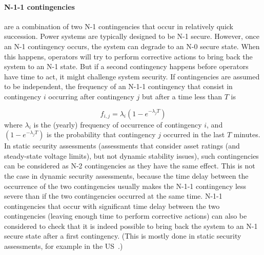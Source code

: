 \paragraph*{N-1-1 contingencies} are a combination of two N-1 contingencies that occur in relatively quick succession. Power systems are typically designed to be N-1 secure. However, once an N-1 contingency occurs, the system can degrade to an N-0 secure state. When this happens, operators will try to perform corrective actions to bring back the system to an N-1 state. But if a second contingency happens before operators have time to act, it might challenge system security. If contingencies are assumed to be independent, the frequency of an N-1-1 contingency that consist in contingency \(i\) occurring after contingency \(j\) but after a time less than \(T\) is

\begin{equation}
\label{eq:N-1-1_frequency}
    f_{i,j} = \lambda_i  (1-e^{-\lambda_j T})
\end{equation}
\noindent where \(\lambda_i\) is the (\eg yearly) frequency of occurrence of contingency \(i\), and \((1-e^{-\lambda_j T})\) is the probability that contingency \(j\) occurred in the last \(T\) minutes. In static security assessments (\ie assessments that consider asset ratings (and steady-state voltage limits), but not dynamic stability issues), such contingencies can be considered as N-2 contingencies as they have the same effect. This is not the case in dynamic security assessments, because the time delay between the occurrence of the two contingencies usually makes the N-1-1 contingency less severe than if the two contingencies occurred at the same time. N-1-1 contingencies that occur with significant time delay between the two contingencies (\ie leaving enough time to perform corrective actions) can also be considered to check that it is indeed possible to bring back the system to an N-1 secure state after a first contingency. (This is mostly done in static security assessments, for example in the US~\cite{ContingencyTypes}.)

